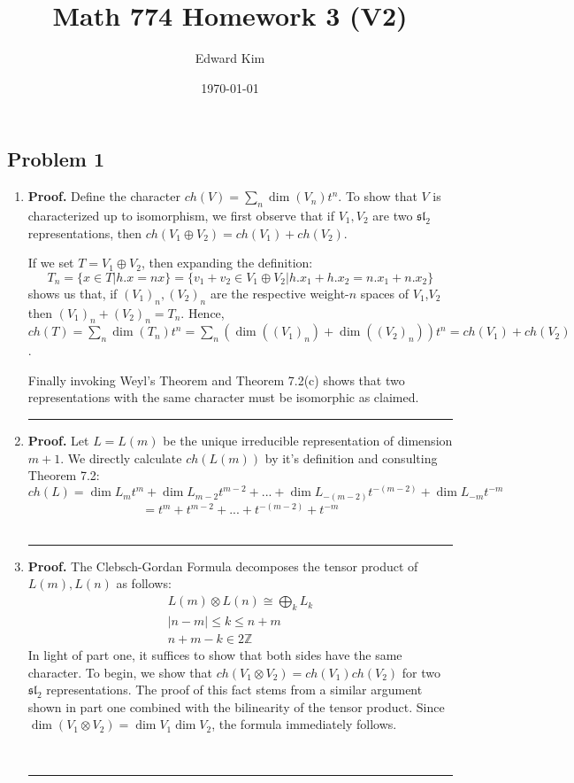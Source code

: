 \documentclass[12pt]{article}%
\newenvironment{proof}[1][Proof]{\textbf{#1.} }{\ \rule{0.5em}{0.5em}}
\begin{document}
\title{Math 774 Homework 3 (V2)}
\author{Edward Kim}
\date{\today}
\maketitle

\subsection*{Problem 1}
\begin{enumerate}
  \item
  \begin{proof}
  Define the character $ch(V) = \sum_n \dim(V_n)t^n$. To show that $V$ is characterized up to isomorphism, we first observe that if $V_1,V_2$ are two $\mathfrak{sl}_2$ representations, then $ch(V_1 \oplus V_2) = ch(V_1) + ch(V_2)$.

  If we set $T = V_1 \oplus V_2$, then expanding the definition:
  $$T_n = \{x \in T \vert h.x = nx\} = \{v_1 + v_2 \in V_1 \oplus V_2 \vert h.x_1 + h.x_2 = n.x_1 + n.x_2 \}$$ shows us that, if $(V_1)_n,(V_2)_n$ are the respective weight-$n$ spaces of $V_1$,$V_2$ then $(V_1)_n + (V_2)_n = T_n$. Hence, $ch(T) = \sum_n \dim(T_n)t^n = \sum_n (\dim((V_1)_n) + \dim((V_2)_n)) t^n = ch(V_1) + ch(V_2)$.

  Finally invoking Weyl's Theorem and Theorem 7.2(c) shows that two representations with the same character must be isomorphic as claimed.
  \end{proof}
  \item
  \begin{proof}
    Let $L = L(m)$ be the unique irreducible representation of dimension $m+1$. We directly calculate $ch(L(m))$ by it's definition and consulting Theorem 7.2:
    $$ ch(L) =  \dim{L_{m}}t^m + \dim{L_{m-2}}t^{m-2} + ... + \dim{L_{-(m-2)}}t^{-(m-2)} + \dim{L_{-m}}t^{-m} $$ $$ = t^m + t^{m-2} + ... + t^{-(m-2)} + t^{-m} $$ \end{proof}
  \item
  \begin{proof}
    The Clebsch-Gordan Formula decomposes the tensor product of $L(m),L(n)$ as follows:
    \begin{gather}
      L(m) \otimes L(n) \cong \bigoplus_k L_k \\
      |n - m| \leq k \leq n + m \\
      n + m - k \in 2 \mathbb{Z}
    \end{gather}
    In light of part one, it suffices to show that both sides have the same character. To begin, we show that $ch(V_1 \otimes V_2) = ch(V_1)ch(V_2)$ for two $\mathfrak{sl}_2$ representations. The proof of this fact stems from a similar argument shown in part one combined with the bilinearity of the tensor product. Since $\dim{(V_1 \otimes V_2)} = \dim{V_1}\dim{V_2}$, the formula immediately follows.


\end{proof}
\end{enumerate}
\end{document}
